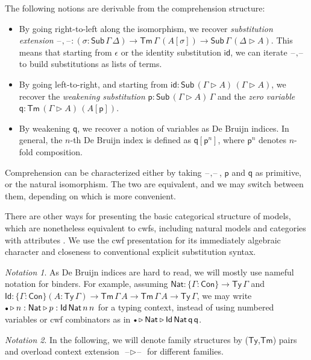 \documentclass[12pt,a4paper,twoside,openany]{book}
\theoremstyle{remark}
\newtheorem{notation}{Notation}
\theoremstyle{definition}
\newcommand{\ms}[1]{\mathsf{#1}}
\newcommand{\id}{\mathsf{id}}
\newcommand{\Con}{\mathsf{Con}}
\newcommand{\Sub}{\mathsf{Sub}}
\newcommand{\Tm}{\mathsf{Tm}}
\newcommand{\Ty}{\mathsf{Ty}}
\newcommand{\Id}{\mathsf{Id}}
\newcommand{\blank}{\mathord{\hspace{1pt}\text{--}\hspace{1pt}}}
\newcommand{\ext}{\triangleright}
\newcommand{\emptycon}{\scaleobj{.75}\bullet}
\newcommand{\p}{\mathsf{p}}
\newcommand{\q}{\mathsf{q}}
\newcommand{\Nat}{\ms{Nat}}
\begin{document}
The following notions are derivable from the comprehension structure:
\begin{itemize}
\item
  By going right-to-left along the isomorphism, we recover \emph{substitution
  extension} $\blank,\blank : (\sigma : \Sub\,\Gamma\,\Delta) \to
  \Tm\,\Gamma\,(A[\sigma]) \to \Sub\,\Gamma\,(\Delta\ext A)$. This means that
  starting from $\epsilon$ or the identity substitution $\id$, we can iterate
  $\blank,\blank$ to build substitutions as lists of terms.
\item
  By going left-to-right, and starting from $\id : \Sub\,(\Gamma\ext
  A)\,(\Gamma\ext A)$, we recover the \emph{weakening substitution} $\p :
  \Sub\,(\Gamma\ext A)\,\Gamma$ and the \emph{zero variable} $\q :
  \Tm\,(\Gamma\ext A)\,(A[\p])$.
\item
  By weakening $\q$, we recover a notion of variables as De Bruijn indices. In
  general, the $n$-th De Bruijn index is defined as $\q[\p^{n}]$, where $\p^{n}$
  denotes $n$-fold composition.
\end{itemize}

Comprehension can be characterized either by taking $\blank,\blank$, $\p$ and
$\q$ as primitive, or the natural isomorphism. The two are equivalent, and we
may switch between them, depending on which is more convenient.

There are other ways for presenting the basic categorical structure of models,
which are nonetheless equivalent to cwfs, including natural models
\cite{awodey18natural} and categories with attributes \cite{cartmellthesis}. We
use the cwf presentation for its immediately algebraic character and closeness
to conventional explicit substitution syntax.

\begin{notation}As De Bruijn indices are hard to read, we will mostly use
nameful notation for binders. For example, assuming $\Nat : \{\Gamma : \Con\}
\to \Ty\,\Gamma$ and $\Id : \{\Gamma : \Con\}(A : \Ty\,\Gamma) \to
\Tm\,\Gamma\,A \to \Tm\,\Gamma\,A \to \Ty\,\Gamma$, we may write $\emptycon \ext
n : \Nat \ext p : \Id\,\Nat\,n\,n$ for a typing context, instead of using
numbered variables or cwf combinators as in $\emptycon \ext \Nat \ext
\Id\,\Nat\,\q\,\q$.
\end{notation}

\begin{notation}
In the following, we will denote family structures by ($\Ty$,$\Tm$) pairs and overload context
extension $\blank\ext\blank$ for different families.
\end{notation}
\end{document}
